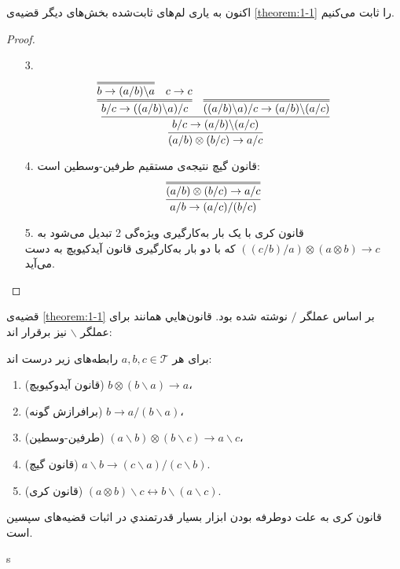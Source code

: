 اکنون به یاری لم‌های ثابت‌شده بخش‌های دیگر قضیه‌ی
\ref{theorem:1-1}
را ثابت می‌کنیم.

\begin{proof}

\begin{enumerate}
\item[3.]
$$
\infer{(a/b)\otimes(b/c) \rightarrow a/c}{
    \infer{b/c \rightarrow (a/b)\backslash(a/c)}{
        \infer={b/c \rightarrow ((a / b) \backslash a) / c}{
            \infer={b \rightarrow (a/b)\backslash a}{}
            &
            c \rightarrow c
        }
        &
        \infer={((a/b) \backslash a)/c \rightarrow (a/b)\backslash(a/c)}{}
    }
}
$$
\item[4.]
قانون گیچ نتیجه‌ی مستقیم طرفین-وسطین است:
$$
\infer{a/b \rightarrow (a /c ) / (b / c)}{
    \infer={(a/b)\otimes(b/c) \rightarrow a/c}{}
}
$$
\item[5.]
قانون کری با یک بار به‌کارگیری ویژه‌گی 2 تبدیل می‌شود به
$((c/b)/a)\otimes(a \otimes b) \rightarrow c$
که با دو بار به‌کارگیری قانون آیدکیویچ به دست می‌آید.
\end{enumerate}
\end{proof}

قضیه‌ی 
\ref{theorem:1-1}
بر اساس عملگر 
$/$
نوشته شده بود. قانون‌هایي همانند برای عملگر
$\backslash$
نیز برقرار اند:

\begin{theorem}
\label{theorem:1-1inverse}
برای هر
$a, b, c \in \mathcal{T}$
رابطه‌های زیر درست اند:
\begin{enumerate}
\item
(قانون آیدوکیویچ)
$b \otimes (b \backslash a) \rightarrow a$،
\item 
(برافرازش گونه)
$b \rightarrow a / (b \backslash a)$،
\item
(طرفین-وسطین)
$(a \backslash b) \otimes (b \backslash c) \rightarrow a \backslash c$،
\item
(قانون گیچ)
$a \backslash b \rightarrow (c \backslash a) / (c \backslash b)$.
\item
(قانون کری)
$(a \otimes b) \backslash c \leftrightarrow b \backslash (a \backslash c)$.
\end{enumerate}
\end{theorem}

قانون کری به علت دوطرفه بودن ابزار بسیار قدرتمندي در اثبات قضیه‌های سپسین است.

s